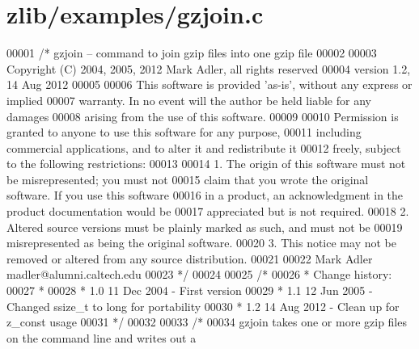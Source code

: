 \hypertarget{zlib_2examples_2gzjoin_8c_source}{}\section{zlib/examples/gzjoin.c}
\label{zlib_2examples_2gzjoin_8c_source}

\begin{DoxyCode}
00001 \textcolor{comment}{/* gzjoin -- command to join gzip files into one gzip file}
00002 \textcolor{comment}{}
00003 \textcolor{comment}{  Copyright (C) 2004, 2005, 2012 Mark Adler, all rights reserved}
00004 \textcolor{comment}{  version 1.2, 14 Aug 2012}
00005 \textcolor{comment}{}
00006 \textcolor{comment}{  This software is provided 'as-is', without any express or implied}
00007 \textcolor{comment}{  warranty.  In no event will the author be held liable for any damages}
00008 \textcolor{comment}{  arising from the use of this software.}
00009 \textcolor{comment}{}
00010 \textcolor{comment}{  Permission is granted to anyone to use this software for any purpose,}
00011 \textcolor{comment}{  including commercial applications, and to alter it and redistribute it}
00012 \textcolor{comment}{  freely, subject to the following restrictions:}
00013 \textcolor{comment}{}
00014 \textcolor{comment}{  1. The origin of this software must not be misrepresented; you must not}
00015 \textcolor{comment}{     claim that you wrote the original software. If you use this software}
00016 \textcolor{comment}{     in a product, an acknowledgment in the product documentation would be}
00017 \textcolor{comment}{     appreciated but is not required.}
00018 \textcolor{comment}{  2. Altered source versions must be plainly marked as such, and must not be}
00019 \textcolor{comment}{     misrepresented as being the original software.}
00020 \textcolor{comment}{  3. This notice may not be removed or altered from any source distribution.}
00021 \textcolor{comment}{}
00022 \textcolor{comment}{  Mark Adler    madler@alumni.caltech.edu}
00023 \textcolor{comment}{ */}
00024 
00025 \textcolor{comment}{/*}
00026 \textcolor{comment}{ * Change history:}
00027 \textcolor{comment}{ *}
00028 \textcolor{comment}{ * 1.0  11 Dec 2004     - First version}
00029 \textcolor{comment}{ * 1.1  12 Jun 2005     - Changed ssize\_t to long for portability}
00030 \textcolor{comment}{ * 1.2  14 Aug 2012     - Clean up for z\_const usage}
00031 \textcolor{comment}{ */}
00032 
00033 \textcolor{comment}{/*}
00034 \textcolor{comment}{   gzjoin takes one or more gzip files on the command line and writes out a}

\end{DoxyCode}
